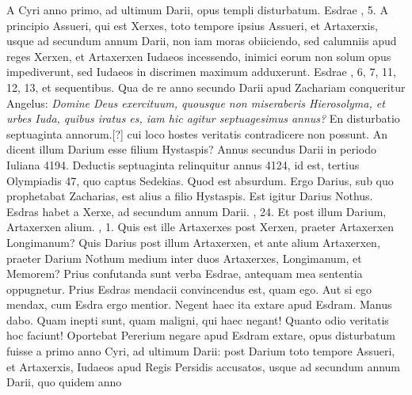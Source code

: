 A Cyri anno primo, ad ultimum Darii, opus
templi disturbatum.
Es\-drae , 5.
A principio Assueri, qui est
Xerxes, toto tempore ipsius Assueri, et Artaxerxis, usque ad secundum
annum Darii, non iam moras obiiciendo, sed calumniis apud
reges Xerxen, et Artaxerxen Iudaeos incessendo, inimici eorum
non solum opus impediverunt, sed Iudaeos in discrimen maximum
adduxerunt.
Esdrae , 6, 7, 11, 12, 13, et sequentibus.
Qua de re
anno secundo Darii apud Zachariam conqueritur Angelus: \textit{Domine
Deus exercituum, quousque non miseraberis Hierosolyma, et
urbes Iuda, quibus iratus es, iam hic agitur septuagesimus annus?}
En disturbatio septuaginta annorum.[?] cui loco hostes
 veritatis contradicere
non possunt.
An dicent illum Darium esse filium Hystaspis?
Annus secundus Darii in periodo Iuliana 4194. Deductis septuaginta
relinquitur annus 4124, id est, tertius Olympiadis 47,
quo captus Sedekias.
Quod est absurdum.
Ergo Darius, sub quo
prophetabat Zacharias, est alius a filio Hystaspis.
Est igitur Darius
Nothus.
Esdras habet a Xerxe, ad secundum annum Darii.
, 24.
Et post illum Darium, Artaxerxen alium.
, 1.
Quis
est ille Artaxerxes post Xerxen, praeter Artaxerxen Longimanum?
Quis Darius post illum Artaxerxen, et ante alium Artaxerxen, praeter
Darium Nothum medium inter duos Artaxerxes, Longimanum,
et Memorem?
Prius confutanda sunt verba Esdrae, antequam
mea sententia oppugnetur.
Prius Esdras mendacii convincendus
est, quam ego.
Aut si ego mendax, cum Esdra ergo mentior.
Negent haec ita extare apud Esdram.
Manus dabo.
Quam inepti
sunt, quam maligni, qui haec negant!
Quanto odio veritatis hoc faciunt!
Oportebat Pererium negare apud Esdram extare, opus disturbatum
fuisse a primo anno Cyri, ad ultimum Darii: post Darium
toto tempore Assueri, et Artaxerxis, Iudaeos apud Regis Persidis
accusatos, usque ad secundum annum Darii, quo quidem anno
